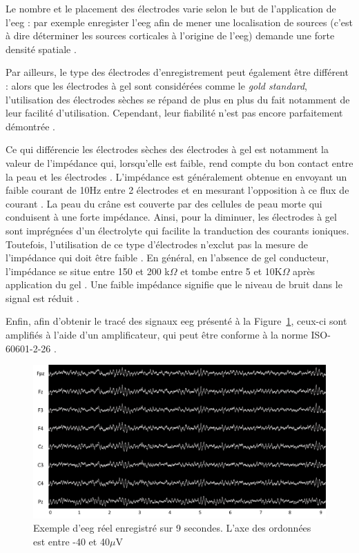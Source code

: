 Le nombre et le placement des électrodes varie selon le but de l'application de l'\gls{eeg} : par exemple enregister l'\gls{eeg} afin
de mener une localisation de sources (c'est à dire déterminer les sources corticales à l'origine de l'\gls{eeg}) demande une forte densité spatiale \citep{Lantz2003}. 

Par ailleurs, le type des électrodes d'enregistrement peut également être différent : 
alors que les électrodes à gel sont considérées comme le \textit{gold standard}, l'utilisation des électrodes sèches se répand de plus 
en plus du fait notamment de leur facilité d'utilisation. Cependant, leur fiabilité n'est pas encore parfaitement démontrée \citep{Lopez2014}. 

Ce qui différencie les électrodes sèches des électrodes à gel est notamment la valeur de l'impédance qui, lorsqu'elle est faible, rend compte du bon contact entre la peau et les électrodes \citep{Lopez2014}. 
L'impédance est généralement obtenue en envoyant un faible courant de 10Hz entre 2 électrodes et en mesurant l'opposition à ce flux de courant \citep{Kappenman2010}. La peau du crâne est 
couverte par des cellules de peau morte qui conduisent à une forte impédance.
Ainsi, pour la diminuer, les électrodes à gel sont imprégnées d'un électrolyte qui facilite la tranduction des courants ioniques. Toutefois, l'utilisation de ce type d'électrodes 
n'exclut pas la mesure de l'impédance qui doit être faible \citep{Lopez2014}. En général, en l'absence de gel conducteur, l'impédance se
situe entre 150 et 200 k$\Omega$ et tombe entre 5 et 10K$\Omega$ après application du gel \citep{Lopez2014}. Une faible impédance signifie 
que le niveau de bruit dans le signal est réduit \citep{Kappenman2010}.

Enfin, afin d'obtenir le tracé des signaux \gls{eeg} présenté à la Figure~\ref{Figure:introduction_eeg_example}, ceux-ci sont amplifiés 
à l'aide d'un amplificateur, qui peut être conforme à la norme ISO-60601-2-26 \citep{ISO}. 

\begin{figure}[h!]
  \centering
	\includegraphics[width=1\linewidth]{figures/chapter-1/introduction-eeg-example} 
  \caption{Exemple d'\gls{eeg} réel enregistré sur 9 secondes. L'axe des ordonnées est entre -40 et 40$\mu$V }
  \label{Figure:introduction_eeg_example}
\end{figure}

